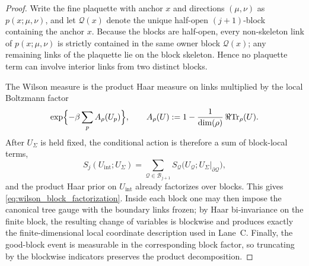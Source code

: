 \begin{proof}
Write the fine plaquette with anchor $x$ and directions $(\mu,\nu)$ as $p(x;\mu,\nu)$, and let $\mathcal Q(x)$ denote the unique half-open $(j+1)$-block containing the anchor $x$.
Because the blocks are half-open, every non-skeleton link of $p(x;\mu,\nu)$ is strictly contained in the same owner block $\mathcal Q(x)$; any remaining links of the plaquette lie on the block skeleton.
Hence no plaquette term can involve interior links from two distinct blocks.

The Wilson measure is the product Haar measure on links multiplied by the local Boltzmann factor
\[
\exp\Bigl\{-\beta\sum_{p}A_\rho(U_p)\Bigr\},
\qquad
A_\rho(U):=1-\frac{1}{\dim(\rho)}\,\Re\mathrm{Tr}_{\rho}(U).
\]
After $U_{\Sigma}$ is held fixed, the conditional action is therefore a sum of block-local terms,
\[
S_j(U_{\mathrm{int}};U_{\Sigma})=\sum_{\mathcal Q\in\mathcal B_{j+1}} S_{\mathcal Q}\bigl(U_{\mathcal Q};U_{\Sigma}|_{\partial \mathcal Q}\bigr),
\]
and the product Haar prior on $U_{\mathrm{int}}$ already factorizes over blocks.
This gives \eqref{eq:wilson_block_factorization}.
Inside each block one may then impose the canonical tree gauge with the boundary links frozen; by Haar bi-invariance on the finite block, the resulting change of variables is blockwise and produces exactly the finite-dimensional local coordinate description used in Lane~C.
Finally, the good-block event is measurable in the corresponding block factor, so truncating by the blockwise indicators preserves the product decomposition.
\end{proof}

